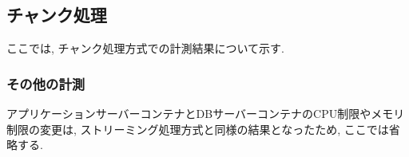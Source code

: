 \documentclass[../../../main]{subfiles}
\begin{document}
    \subsection{チャンク処理}\label{subsec:result-chunk}

    ここでは, チャンク処理方式での計測結果について示す.

    

    \subsubsection{その他の計測}

    アプリケーションサーバーコンテナとDBサーバーコンテナのCPU制限やメモリ制限の変更は, ストリーミング処理方式と同様の結果となったため, ここでは省略する.
\end{document}
